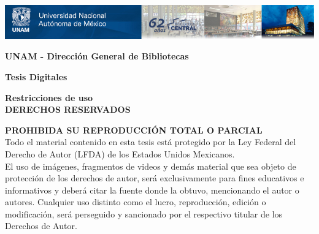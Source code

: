 \includegraphics[width = \textwidth]{DGB.png} %

\textbf{UNAM - Dirección General de Bibliotecas}

\textbf{Tesis Digitales}
 
\textbf{Restricciones de uso}\\

\textbf{DERECHOS RESERVADOS \textcopyright}

\textbf{PROHIBIDA SU REPRODUCCIÓN TOTAL O PARCIAL}\\

Todo el material contenido en esta tesis está protegido por la Ley Federal del Derecho de Autor (LFDA) de los Estados Unidos Mexicanos.\\

El uso de imágenes, fragmentos de videos y demás material que sea objeto de protección de los derechos de autor, será exclusivamente para fines educativos e informativos y deberá citar la fuente donde la obtuvo, mencionando el autor o autores. Cualquier uso distinto como el lucro, reproducción, edición o modificación, será perseguido y sancionado por el respectivo titular de los Derechos de Autor.

\newpage %
\thispagestyle{empty} %

